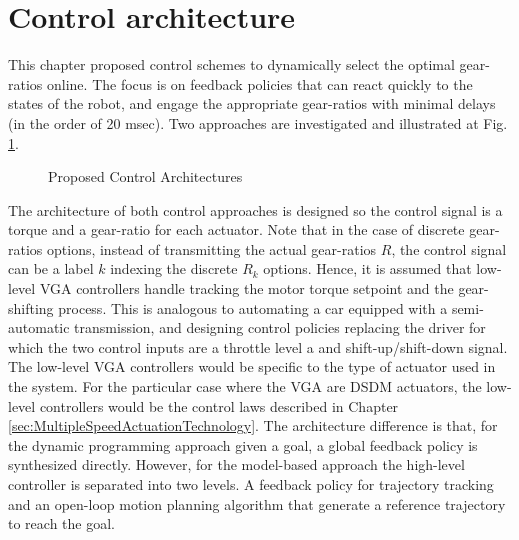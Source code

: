 \newpage

\section{Control architecture}
\label{sec:arch}

This chapter proposed control schemes to dynamically select the optimal gear-ratios online. The focus is on feedback policies that can react quickly to the states of the robot, and engage the appropriate gear-ratios with minimal delays (in the order of 20 msec). Two approaches are investigated and illustrated at Fig. \ref{fig:controlarchitectures}. 
%
\begin{figure}[H]
				\vspace{-10pt}
        \centering
				\hspace{+10pt}
        \caption{Proposed Control Architectures}
				\label{fig:controlarchitectures}
\end{figure}
%
The architecture of both control approaches is designed so the control signal is a torque and a gear-ratio for each actuator. Note that in the case of discrete gear-ratios options, instead of transmitting the actual gear-ratios $R$, the control signal can be a label $k$ indexing the discrete $R_k$ options. Hence, it is assumed that low-level VGA controllers handle tracking the motor torque setpoint and the gear-shifting process. This is analogous to automating a car equipped with a semi-automatic transmission, and designing control policies replacing the driver for which the two control inputs are a throttle level a and shift-up/shift-down signal. The low-level VGA controllers would be specific to the type of actuator used in the system. For the particular case where the VGA are DSDM actuators, the low-level controllers would be the control laws described in Chapter \ref{sec:MultipleSpeedActuationTechnology}. The architecture difference is that, for the dynamic programming approach given a goal, a global feedback policy is synthesized directly. However, for the model-based approach the high-level controller is separated into two levels. A feedback policy for trajectory tracking and an open-loop motion planning algorithm that generate a reference trajectory to reach the goal. 

